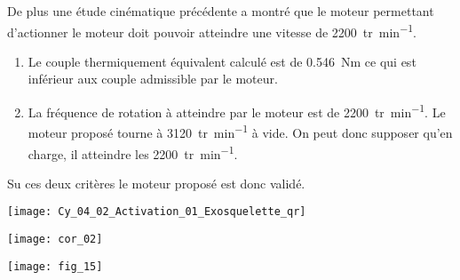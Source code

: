 De plus une étude cinématique précédente a montré que le moteur permettant d'actionner le moteur doit pouvoir atteindre une vitesse de \SI{2200}{tr.min^{-1}}.

\fi



\ifprof
\begin{corrige}
\begin{enumerate}
\item Le couple thermiquement équivalent calculé est de \SI{0,546}{Nm} ce qui est inférieur aux couple admissible par le moteur. 
\item La fréquence de rotation à atteindre par le moteur est de \SI{2200}{tr.min^{-1}}. Le moteur proposé tourne à \SI{3120}{tr.min^{-1}} à vide. On peut donc supposer qu'en charge, il atteindre les \SI{2200}{tr.min^{-1}}.
\end{enumerate}
Su ces deux critères le moteur proposé est donc validé. 
\end{corrige}
\else
\fi

\ifprof
\else

\ifcolle
\else
{}
\fi
\fi

\ifprof
\else
\begin{marginfigure}
\centering
\texttt{[image: Cy\_04\_02\_Activation\_01\_Exosquelette\_qr]}
\end{marginfigure}
\fi


\ifprof
\begin{center}
\texttt{[image: cor\_02]}
\end{center}

\else


\begin{center}
\texttt{[image: fig\_15]}
\end{center}
\fi

